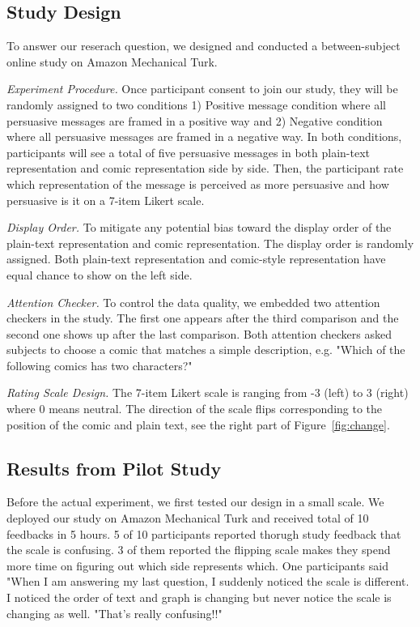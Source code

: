 \subsection{Study Design}
To answer our reserach question, we designed and conducted a between-subject online study on Amazon Mechanical Turk.

\textit{Experiment Procedure.} Once participant consent to join our study, they will be randomly assigned to two conditions 1) Positive message condition where all persuasive messages are framed in a positive way and 2) Negative condition where all persuasive messages are framed in a negative way. In both conditions, participants will see a total of five persuasive messages in both plain-text representation and comic representation side by side. Then, the participant rate which representation of the message is perceived as more persuasive and how persuasive is it on a 7-item Likert scale.

\textit{Display Order.} To mitigate any potential bias toward the display order of the plain-text representation and comic representation. The display order is randomly assigned. Both plain-text representation and comic-style representation have equal chance to show on the left side.

\textit{Attention Checker.} To control the data quality, we embedded two attention checkers in the study. The first one appears after the third comparison and the second one shows up after the last comparison. Both attention checkers asked subjects to choose a comic that matches a simple description, e.g. "Which of the following comics has two characters?"

\textit{Rating Scale Design.} The 7-item Likert scale is ranging from -3 (left) to 3 (right) where 0 means neutral. The direction of the scale flips corresponding to the position of the comic and plain text, see the right part of Figure~\ref{fig:change}.


\subsection{Results from Pilot Study}
Before the actual experiment, we first tested our design in a small scale. We deployed our study on Amazon Mechanical Turk and received total of 10 feedbacks in 5 hours. 5 of 10 participants reported thorugh study feedback that the scale is confusing. 3 of them reported the flipping scale makes they spend more time on figuring out which side represents which. One participants said "When I am answering my last question, I suddenly noticed the scale is different. I noticed the order of text and graph is changing but never notice the scale is changing as well. "That's really confusing!!"

